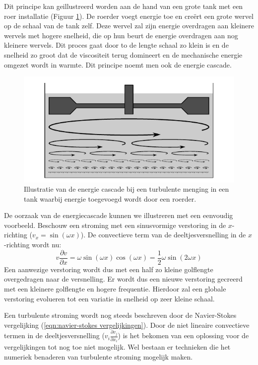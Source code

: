Dit principe kan geillustreerd worden aan de hand van een grote tank met een roer installatie (Figuur \ref{fig:Energie_cascade}). De roerder voegt energie toe en creërt een grote wervel op de schaal van de tank zelf. Deze wervel zal zijn energie overdragen aan kleinere wervels met hogere snelheid, die op hun beurt de energie overdragen aan nog kleinere wervels. Dit proces gaat door to de lengte schaal zo klein is en de snelheid zo groot dat de viscositeit terug domineert en de mechanische energie omgezet wordt in warmte. Dit principe noemt men ook de energie cascade.
\begin{figure}[htb]
	\centering
	\includegraphics{fig/uitwendige_stroming/Energie_cascade}
	\caption{Illustratie van de energie cascade bij een turbulente menging in een tank waarbij energie toegevoegd wordt door een roerder.}
	\label{fig:Energie_cascade}
\end{figure}

De oorzaak van de energiecascade kunnen we illustreren met een eenvoudig voorbeeld. Beschouw een stroming met een sinusvormige verstoring in de $x$-richting ($v_x = \sin(\omega x)$). De convectieve term van de deeltjesversnelling in de $x$-richting wordt nu:
\begin{equation}
	v \frac{\partial v}{\partial x} = \omega \sin(\omega x) \cos(\omega x) = \frac{1}{2} \omega \sin( 2 \omega x) 
\end{equation}
Een aanwezige verstoring wordt dus met een half zo kleine golflengte overgedragen naar de versnelling. Er wordt dus een nieuwe verstoring gecreerd met een kleinere golflengte en hogere frequentie. Hierdoor zal een globale verstoring evolueren tot een variatie in snelheid op zeer kleine schaal.

Een turbulente stroming wordt nog steeds beschreven door de Navier-Stokes vergelijking (\ref{eqn:navier-stokes vergelijkingen}). Door de niet lineaire convectieve termen in de deeltjesversnelling ($v_i \frac{\partial v_j}{\partial x_i}$) is het bekomen van een oplossing voor de vergelijkingen tot nog toe niet mogelijk. Wel bestaan er technieken die het numeriek benaderen van turbulente stroming mogelijk maken.

